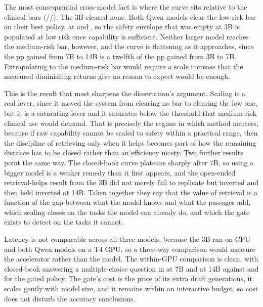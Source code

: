 The most consequential cross-model fact is where the curve sits relative to
the clinical bars (\barLow{}/\barMedium{}/\barHigh{}). The 3B cleared none.
Both Qwen models clear the \barLow{} low-risk bar on their best policy, at
\accQwenPthreeMcq{} and \accQwenFourteenPthreeMcq{}, so the safety envelope
that was empty at 3B is populated at low risk once capability is sufficient.
Neither larger model reaches the \barMedium{} medium-risk bar, however, and
the curve is flattening as it approaches, since the \scaleGainLarge{}pp gained
from 7B to 14B is a twelfth of the \scaleGainSmall{}pp gained from 3B to 7B.
Extrapolating to the medium-risk bar would require a scale increase that the
measured diminishing returns give no reason to expect would be enough.

This is the result that most sharpens the dissertation's argument. Scaling is
a real lever, since it moved the system from clearing no bar to clearing the
low one, but it is a saturating lever and it saturates below the threshold
that medium-risk clinical use would demand. That is precisely the regime in
which method matters, because if raw capability cannot be scaled to safety
within a practical range, then the discipline of retrieving only when it helps
becomes part of how the remaining distance has to be closed rather than an
efficiency nicety. Two further results point the same way. The closed-book
curve plateaus sharply after 7B, so using a bigger model is a weaker remedy
than it first appears, and the open-ended retrieval-helps result from the 3B
did not merely fail to replicate but inverted and then held inverted at 14B.
Taken together they say that the value of retrieval is a function of the gap
between what the model knows and what the passages add, which scaling closes
on the tasks the model can already do, and which the gate exists to detect on
the tasks it cannot.

Latency is not comparable across all three models, because the 3B ran on CPU
and both Qwen models on a T4 GPU, so a three-way comparison would measure the
accelerator rather than the model. The within-GPU comparison is clean, with
closed-book answering a multiple-choice question in \latQwenPthreeMcq{} at 7B
and \latQwenFourteenPthreeMcq{} at 14B against \latQwenPfiveMcq{} and
\latQwenFourteenPfiveMcq{} for the gated policy. The gate's cost is the price
of its extra draft generations, it scales gently with model size, and it
remains within an interactive budget, so cost does not disturb the accuracy
conclusions.